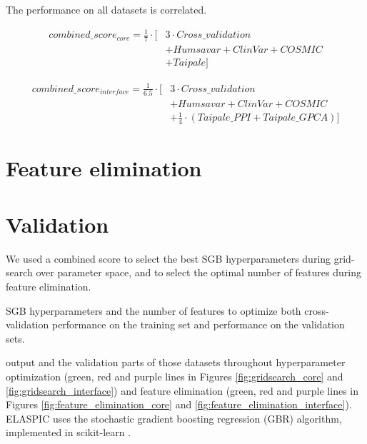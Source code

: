 The performance on all datasets is correlated.

\begin{equation} \label{eq:combined_score_core}
	\begin{aligned}
    combined\_score_{core} =
		\frac{1}{7} \cdot \Big[
			& 3 \cdot Cross\_validation \\
			& + Humsavar + ClinVar + COSMIC \\
			& + Taipale\Big]
	\end{aligned}
\end{equation}

\begin{equation} \label{eq:combined_score_interface}
	\begin{aligned}
    combined\_score_{interface} =
		\frac{1}{6.5} \cdot \Big[
			& 3 \cdot Cross\_validation \\
			& + Humsavar + ClinVar + COSMIC \\
			& + \frac{1}{4} \cdot \left(Taipale\_{PPI} + Taipale\_{GPCA}\right)\Big]
	\end{aligned}
\end{equation}


\section{Feature elimination}



\section{Validation}

We used a combined score to select the best SGB hyperparameters during grid-search over parameter space, and to select the optimal number of features during feature elimination.


SGB hyperparameters and the number of features to optimize both cross-validation performance on the training set and performance on the validation sets.






output and the validation parts of those datasets throughout hyperparameter optimization (green, red and purple lines in Figures \ref{fig:gridsearch_core} and \ref{fig:gridsearch_interface}) and feature elimination (green, red and purple lines in Figures \ref{fig:feature_elimination_core} and \ref{fig:feature_elimination_interface}). ELASPIC uses the stochastic gradient boosting regression (GBR) algorithm, implemented in scikit-learn \cite{scikit-learn}.



